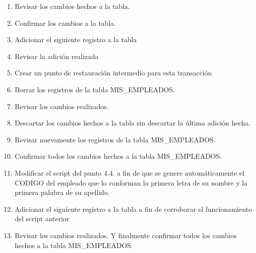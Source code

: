 \begin{enumerate}[1.]
	\item Revisar los cambios hechos a la tabla.
	\item Confirmar los cambios a la tabla.
	\item Adicionar el siguiente registro a la tabla
	\item Revisar la adición realizada
	\item Crear un punto de restauración intermedio para esta transacción
	\item Borrar los registros de la tabla MIS\_EMPLEADOS.
	\item Revisar los cambios realizados.
	\item Descartar los cambios hechos a la tabla sin descartar la última adición hecha.
	\item Revisar nuevamente los registros de la tabla MIS\_EMPLEADOS.
	\item Confirmar todos los cambios hechos a la tabla MIS\_EMPLEADOS.
	\item Modificar el script del punto 4.4. a fin de que se genere automáticamente el CODIGO del empleado que lo conforman la primera letra de su nombre y la primera palabra de su apellido.
	\item Adicionar el siguiente registro a la tabla a fin de corroborar el funcionamiento del script anterior
	\item Revisar los cambios realizados. Y finalmente confirmar todos los cambios hechos a la tabla MIS\_EMPLEADOS.

\end{enumerate} 
